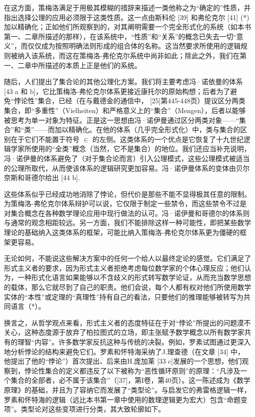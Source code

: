 在这方面，策梅洛满足于用极其模糊的措辞来描述一类他称之为“确定的”性质，并指出选择公理的应用必须限于这类性质。这一点由斯科伦 {[}39{]} 和弗伦克尔 {[}41{]} (*) 加以精确化；正如他们所观察到的，对其阐明需要一个完全形式化的系统（如本书第一、二章所描述的那样），在该系统中，“性质”和“关系”的概念已失去一切“意义”，而仅仅成为按照明确法则形成的组合体的名称。这当然要求所使用的逻辑规则被纳入该系统，而这在策梅洛-弗伦克尔系统中尚非如此；除此之外，我们在第一、二章中所描述的本质上正是他们的系统。

随后，人们提出了集合论的其他公理化方案。我们将主要考虑冯·诺依曼的体系 {[}43 a 和 b{]}，它比策梅洛-弗伦克尔体系更接近康托尔的原始构想；后者为了避免“悖论性”集合，已经（在与戴德金的通信中， {[}25{]}第445-448页）提议区分两类集合，即“多重性”（Vielheiten）和严格意义上的“集合”（Mengen），后者以能够被思考为单一对象为特征。正是这一思想由冯·诺伊曼通过区分两类对象——“集合”和“类”——而加以精确化。在他的体系（几乎完全形式化）中，类与集合的区别在于它们不能置于符号 \(\in\) 的左侧。这类体系的一个优点是它恢复了十九世纪逻辑学家所使用的“全类”概念（当然，它不是集合）的地位。我们还应当补充说明，冯·诺伊曼的体系避免了（对于集合论而言）引入公理模式，这些公理模式被适当的公理所取代，从而使该体系的逻辑研究更加容易。冯·诺伊曼体系的变体由贝尔奈斯和哥德尔给出 {[}44 b{]}.

这些体系似乎已经成功地消除了悖论，但代价是那些不能不显得极其任意的限制。为策梅洛-弗伦克尔体系辩护可以说，它仅限于制定一些禁令，而这些禁令不过是对集合概念在各种数学理论应用中现行做法的认可。冯·诺伊曼和哥德尔的体系则与通常的观念相距较远。另一方面，我们不能排除这样一种可能性，即把某些数学理论的基础纳入这类体系的框架，可能比纳入策梅洛-弗伦克尔体系更为僵硬的框架更容易。

无论如何，不能说这些解决方案中的任何一个给人以最终定论的感觉。它们满足了形式主义者的要求，因为形式主义者拒绝考虑每位数学家的个体心理反应；他们认为，一种形式化语言如果能够以不含歧义的形式转写数学论证，从而充当数学思想的载体，那么它就尽到了自己的职责。他们会说，每个人都有权对他们所使用数学实体的“本性”或定理的“真理性”持有自己的看法，只要他们的推理能够被转写为共同语言（*）。

换言之，从哲学观点来看，形式主义者的态度特征在于对“悖论”所提出的问题漠不关心，这种态度源于放弃了柏拉图式的立场，即主张赋予数学概念以所有数学家共有的理智“内容”。许多数学家反抗这种与传统的决裂。例如，罗素试图通过更深入地分析悖论的结构来避免它们。罗素和怀特海采纳了J.理查德（在文章 {[}34{]} 中，他提出了他的“悖论”）首次提出、后来由H.庞加莱 {[}33 c{]}发展的一个思想，他们观察到，悖论性集合的定义都违反了以下被称为“恶性循环原则”的原理：“凡涉及一个集合的全部者，必不属于该集合”（{[}37{]}，第I卷，第40页）。这一陈述成为《数学原理》的基础，并且为了容纳它而发展了“类型论”。与启发它的弗雷格逻辑一样，罗素和怀特海的逻辑（远比本书第一章中使用的数理逻辑更为宏大）包含“命题变项”。类型论对这些变项进行分类，其大致轮廓如下。

